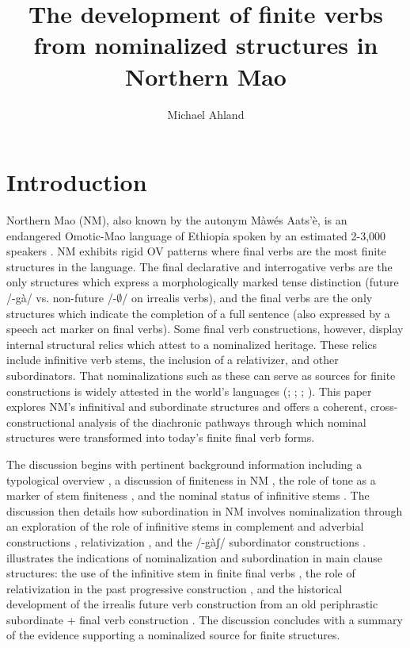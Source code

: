 \documentclass[output=paper]{langsci/langscibook}
\title{The development of finite verbs from nominalized structures in Northern Mao}
\author{%
 Michael Ahland \affiliation{California State University, Long Beach}
}
\begin{document}
\section{Introduction}
Northern Mao (NM), also known by the autonym Màwés Aats'è, is an endangered Omotic-Mao language of Ethiopia \citep{Bender2000} spoken by an estimated 2-3,000 speakers \citep[13]{Ahland2012}. NM exhibits rigid OV patterns where final verbs are the most finite structures in the language. The final declarative and interrogative verbs are the only structures which express a morphologically marked tense distinction (future /-gà/ vs. non-future /-${\emptyset}$/ on irrealis verbs), and the final verbs are the only structures which indicate the completion of a full sentence (also expressed by a speech act marker on final verbs). Some final verb constructions, however, display internal structural relics which attest to a nominalized heritage. These relics include infinitive verb stems, the inclusion of a relativizer, and other subordinators. That nominalizations such as these can serve as sources for finite constructions is widely attested in the world's languages (\citealt{Gildea1993}; \citealt{DeLancey2011}; \citealt[68]{Givon2009}; \citealt[382]{Noonan1997}). This paper explores NM's infinitival and subordinate structures and offers a coherent, cross-constructional analysis of the diachronic pathways through which nominal structures were transformed into today's finite final verb forms.

The discussion begins with pertinent background information including a typological overview , a discussion of finiteness in NM , the role of tone as a marker of stem finiteness , and the nominal status of infinitive stems . The discussion then details how subordination in NM involves nominalization through an exploration of the role of infinitive stems in complement and adverbial constructions , relativization , and the /-gàʃ/ subordinator constructions .  illustrates the indications of nominalization and subordination in main clause structures: the use of the infinitive stem in finite final verbs , the role of relativization in the past progressive construction , and the historical development of the irrealis future verb construction from an old periphrastic subordinate + final verb construction . The discussion concludes with a summary of the evidence supporting a nominalized source for finite structures. 
\end{document}
